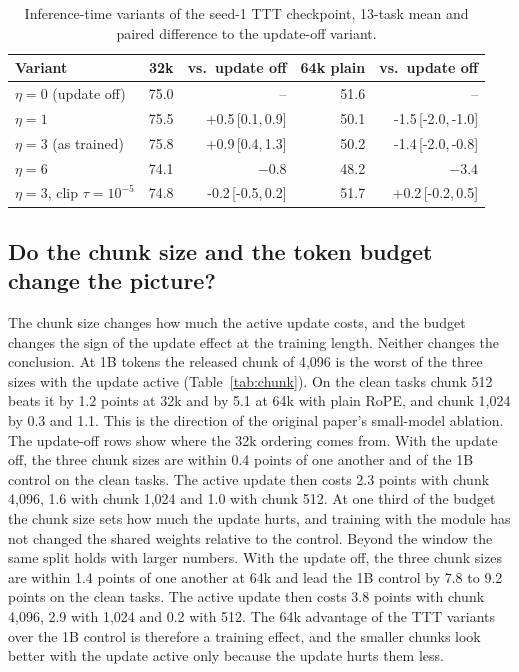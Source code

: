 \documentclass{article}
\newcommand{\ci}[3]{#1\,[#2,\,#3]}
\begin{document}
\begin{table}[t]
\caption{Inference-time variants of the seed-1 TTT checkpoint, 13-task mean and paired difference to the update-off variant.}
\label{tab:sweep}
\centering
\footnotesize
\begin{tabular}{lrrrr}
\toprule
Variant & 32k & vs.\ update off & 64k plain & vs.\ update off \\
\midrule
$\eta = 0$ (update off) & 75.0 & -- & 51.6 & -- \\
$\eta = 1$ & 75.5 & \ci{+0.5}{0.1}{0.9} & 50.1 & \ci{-1.5}{-2.0}{-1.0} \\
$\eta = 3$ (as trained) & 75.8 & \ci{+0.9}{0.4}{1.3} & 50.2 & \ci{-1.4}{-2.0}{-0.8} \\
$\eta = 6$ & 74.1 & $-0.8$ & 48.2 & $-3.4$ \\
$\eta = 3$, clip $\tau = 10^{-5}$ & 74.8 & \ci{-0.2}{-0.5}{0.2} & 51.7 & \ci{+0.2}{-0.2}{0.5} \\
\bottomrule
\end{tabular}
\end{table}

\subsection{Do the chunk size and the token budget change the picture?}

The chunk size changes how much the active update costs, and the budget changes the sign of the update effect at the training length. Neither changes the conclusion. At 1B tokens the released chunk of 4,096 is the worst of the three sizes with the update active (Table~\ref{tab:chunk}). On the clean tasks chunk 512 beats it by 1.2 points at 32k and by 5.1 at 64k with plain RoPE, and chunk 1,024 by 0.3 and 1.1. This is the direction of the original paper's small-model ablation. The update-off rows show where the 32k ordering comes from. With the update off, the three chunk sizes are within 0.4 points of one another and of the 1B control on the clean tasks. The active update then costs 2.3 points with chunk 4,096, 1.6 with chunk 1,024 and 1.0 with chunk 512. At one third of the budget the chunk size sets how much the update hurts, and training with the module has not changed the shared weights relative to the control. Beyond the window the same split holds with larger numbers. With the update off, the three chunk sizes are within 1.4 points of one another at 64k and lead the 1B control by 7.8 to 9.2 points on the clean tasks. The active update then costs 3.8 points with chunk 4,096, 2.9 with 1,024 and 0.2 with 512. The 64k advantage of the TTT variants over the 1B control is therefore a training effect, and the smaller chunks look better with the update active only because the update hurts them less.
\end{document}
